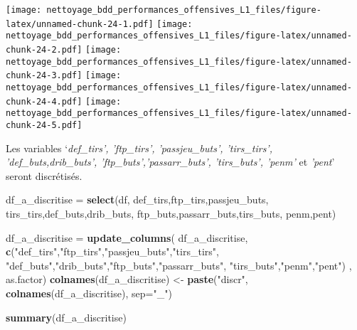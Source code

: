 \documentclass[7pt,]{report}
\newenvironment{Shaded}{\begin{snugshade}}{\end{snugshade}}
\newcommand{\DataTypeTok}[1]{\textcolor[rgb]{0.13,0.29,0.53}{#1}}
\newcommand{\KeywordTok}[1]{\textcolor[rgb]{0.13,0.29,0.53}{\textbf{#1}}}
\newcommand{\NormalTok}[1]{#1}
\newcommand{\OperatorTok}[1]{\textcolor[rgb]{0.81,0.36,0.00}{\textbf{#1}}}
\newcommand{\StringTok}[1]{\textcolor[rgb]{0.31,0.60,0.02}{#1}}
\begin{document}
\begin{Shaded}
\end{Shaded}

\texttt{[image: nettoyage\_bdd\_performances\_offensives\_L1\_files/figure-latex/unnamed-chunk-24-1.pdf]} \texttt{[image: nettoyage\_bdd\_performances\_offensives\_L1\_files/figure-latex/unnamed-chunk-24-2.pdf]} \texttt{[image: nettoyage\_bdd\_performances\_offensives\_L1\_files/figure-latex/unnamed-chunk-24-3.pdf]} \texttt{[image: nettoyage\_bdd\_performances\_offensives\_L1\_files/figure-latex/unnamed-chunk-24-4.pdf]} \texttt{[image: nettoyage\_bdd\_performances\_offensives\_L1\_files/figure-latex/unnamed-chunk-24-5.pdf]}

Les variables `\emph{def\_tirs', 'ftp\_tirs', 'passjeu\_buts', 'tirs\_tirs', 'def\_buts,drib\_buts', 'ftp\_buts','passarr\_buts', 'tirs\_buts', 'penm'} et \emph{'pent}' seront discrétisés.

\begin{Shaded}
\begin{Highlighting}[]
\NormalTok{df_a_discritise =}\StringTok{ }\KeywordTok{select}\NormalTok{(df,}
\NormalTok{                         def_tirs,ftp_tirs,passjeu_buts,}
\NormalTok{                         tirs_tirs,def_buts,drib_buts,}
\NormalTok{                         ftp_buts,passarr_buts,tirs_buts,}
\NormalTok{                         penm,pent)}

\NormalTok{df_a_discritise =}\StringTok{ }\KeywordTok{update_columns}\NormalTok{(}
\NormalTok{  df_a_discritise,}
  \KeywordTok{c}\NormalTok{(}\StringTok{"def_tirs"}\NormalTok{,}\StringTok{"ftp_tirs"}\NormalTok{,}\StringTok{"passjeu_buts"}\NormalTok{,}\StringTok{"tirs_tirs"}\NormalTok{,}
    \StringTok{"def_buts"}\NormalTok{,}\StringTok{"drib_buts"}\NormalTok{,}\StringTok{"ftp_buts"}\NormalTok{,}\StringTok{"passarr_buts"}\NormalTok{,}
    \StringTok{"tirs_buts"}\NormalTok{,}\StringTok{"penm"}\NormalTok{,}\StringTok{"pent"}\NormalTok{)}
\NormalTok{                    , as.factor)}
\KeywordTok{colnames}\NormalTok{(df_a_discritise) <-}\StringTok{ }\KeywordTok{paste}\NormalTok{(}\StringTok{"discr"}\NormalTok{,}
                                   \KeywordTok{colnames}\NormalTok{(df_a_discritise),}
                                   \DataTypeTok{sep=}\StringTok{"_"}\NormalTok{)}

\KeywordTok{summary}\NormalTok{(df_a_discritise)}
\end{Highlighting}
\end{Shaded}
\end{document}
